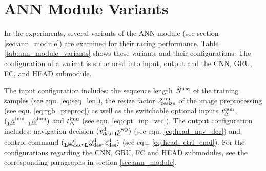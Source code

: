 \section{ANN Module Variants}
In the experiments, several
variants of the ANN module (see section \ref{sec:ann_module})
are examined for their racing performance.
Table \ref{tab:ann_module_variants} shows these variants
and their configurations.
The configuration of a variant
is structured into
input, output and the 
CNN, GRU, FC, and HEAD submodule.

The input configuration includes:
the sequence length ${}_{}^{} \breve{N}^{\text{seq}}_{}$ of the training samples 
(see equ. \ref{eq:seq_len}),
the resize factor ${}_{}^{} \breve{s}^{\text{cnn}}_{\text{resize}}$ 
of the image preprocessing (see equ. \ref{eq:rgb_preproc})
as well as the switchable optional inputs
${}_{}^{} {t}^{\text{cam}}_{\Delta }$, 
$({}_{\textbf{L}}^{} \hat{\underline a}^{\text{imu}}_{},{}_{\textbf{L}}^{} \hat{\underline \omega}^{\text{imu}}_{})$
and
${}_{}^{} {t}^{\text{imu}}_{\Delta }$ (see equ. \ref{eq:opt_inp_vec}).
The output configuration includes:
navigation decision
$({}_{}^{} \tilde{v}^{\text{d}}_{\text{des}}, {}_{\textbf{I}}^{} {\underline p}^{\text{wp}}_{})$ (see equ. \ref{eq:head_nav_dec})
and control command
$({}_{\textbf{L}}^{} {\underline \omega}^{\text{d}}_{\text{des}}, {}_{\textbf{L}}^{} \dot{\underline \omega}^{\text{d}}_{\text{des}}, {}_{}^{} {c}^{\text{d}}_{\text{des}})$ (see equ. \ref{eq:head_ctrl_cmd}).
For the
configurations regarding the CNN, GRU, FC and HEAD submodules,
see the corresponding paragraphs in section \ref{sec:ann_module}. 



